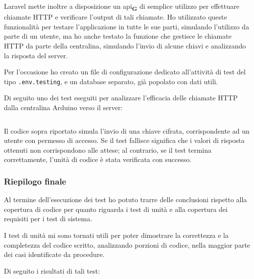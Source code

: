 Laravel mette inoltre a disposizione un \gls{api}\textbf{\textsubscript{G}} di semplice utilizzo per effettuare chiamate HTTP e verificare l'output di tali chiamate. Ho utilizzato queste funzionalità per testare l'applicazione in tutte le sue parti, simulando l'utilizzo da parte di un utente, ma ho anche testato la funzione che gestisce le chiamate HTTP da parte della centralina, simulando l'invio di alcune chiavi e analizzando la risposta del server.

\medskip

Per l'occasione ho creato un file di configurazione dedicato all'attività di test del tipo \verb|.env.testing|, e un database separato, già popolato con dati utili.

\medskip

Di seguito uno dei test eseguiti per analizzare l'efficacia delle chiamate HTTP dalla centralina Arduino verso il server:

\inputminted[bgcolor=bg, frame=lines, framesep=2mm, startinline=true, breaklines=true, fontsize=\small, linenos=true]{php}{capitoli/code.php}

Il codice sopra riportato simula l'invio di una chiave cifrata, corrispondente ad un utente con permesso di accesso. Se il test fallisce significa che i valori di risposta ottenuti non corrispondono alle attese; al contrario, se il test termina correttamente, l'unità di codice è stata verificata con successo.

\subsubsection{Riepilogo finale}
Al termine dell'esecuzione dei test ho potuto trarre delle conclusioni rispetto alla copertura di codice per quanto riguarda i test di unità e alla copertura dei requisiti per i test di sistema.

\medskip

I test di unità mi sono tornati utili per poter dimostrare la correttezza e la completezza del codice scritto, analizzando porzioni di codice, nella maggior parte dei casi identificate da procedure. 

Di seguito i risultati di tali test:


